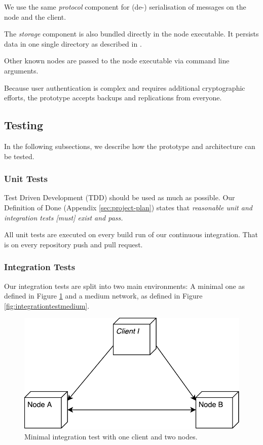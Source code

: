We use the same \emph{protocol} component for (de-) serialisation of messages on the \gls{node} and the \gls{client}.

The \emph{storage} component is also bundled directly in the \gls{node} executable. It persists data in one single directory as described in .

Other known \glspl{node} are passed to the \gls{node} executable via command line arguments.

Because user authentication is complex and requires additional cryptographic efforts, the prototype accepts backups and replications from everyone.

\subsection{Testing}\label{testing}

In the following subsections, we describe how the prototype and architecture can be tested.

\subsubsection{Unit Tests}\label{unit-tests}
Test Driven Development (TDD) \cite{TDD} should be used as much as possible. Our Definition of Done (Appendix \ref{sec:project-plan}) states that \emph{reasonable unit and integration tests [must] exist and pass.}

All unit tests are executed on every build run of our continuous integration. That is on every repository push and pull request.

\subsubsection{Integration Tests}\label{integration-tests}

Our integration tests are split into two main environments: A minimal one as defined in Figure \ref{fig:integrationtestsmall} and a medium network, as defined in Figure \ref{fig:integrationtestmedium}.

\begin{figure}
	\centering
	\includegraphics[width=0.5\linewidth]{resources/integration_test_small}
	\caption[Minimal integration test]{Minimal integration test with one \gls{client} and two \glspl{node}.}
	\label{fig:integrationtestsmall}
\end{figure}

